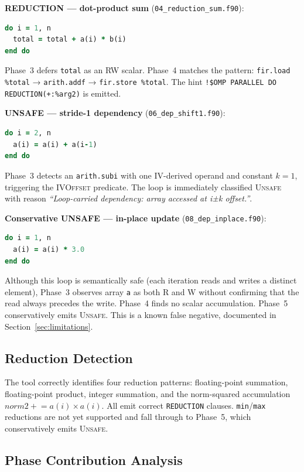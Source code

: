 \documentclass[conference]{IEEEtran}
\begin{document}
\textbf{REDUCTION — dot-product sum} (\texttt{04\_reduction\_sum.f90}):
\begin{lstlisting}[language=Fortran,caption={Scalar accumulation reduction.}]
do i = 1, n
  total = total + a(i) * b(i)
end do
\end{lstlisting}
Phase~3 defers \texttt{total} as an RW scalar.  Phase~4 matches the
pattern: \texttt{fir.load \%total} → \texttt{arith.addf} →
\texttt{fir.store \%total}.  The hint
\texttt{!\$OMP PARALLEL DO REDUCTION(+:\%arg2)} is emitted.

\textbf{UNSAFE — stride-1 dependency} (\texttt{06\_dep\_shift1.f90}):
\begin{lstlisting}[language=Fortran,caption={Loop-carried dependency.}]
do i = 2, n
  a(i) = a(i) + a(i-1)
end do
\end{lstlisting}
Phase~3 detects an \texttt{arith.subi} with one IV-derived operand
and constant $k = 1$, triggering the \textsc{IVOffset} predicate.
The loop is immediately classified \textsc{Unsafe} with reason
\emph{``Loop-carried dependency: array accessed at i±k offset.''}.

\textbf{Conservative UNSAFE — in-place update} (\texttt{08\_dep\_inplace.f90}):
\begin{lstlisting}[language=Fortran,caption={In-place update (conservatively UNSAFE).}]
do i = 1, n
  a(i) = a(i) * 3.0
end do
\end{lstlisting}
Although this loop is semantically safe (each iteration reads and
writes a distinct element), Phase~3 observes array \texttt{a} as both
\textsc{R} and \textsc{W} without confirming that the read always
precedes the write.  Phase~4 finds no scalar accumulation.  Phase~5
conservatively emits \textsc{Unsafe}.  This is a known false negative,
documented in Section~\ref{sec:limitations}.

\subsection{Reduction Detection}

The tool correctly identifies four reduction patterns: floating-point
summation, floating-point product, integer summation, and the
norm-squared accumulation $\textit{norm2} \mathrel{+}=
a(i) \times a(i)$.  All emit correct \texttt{REDUCTION} clauses.
\texttt{min}/\texttt{max} reductions are not yet supported and fall
through to Phase~5, which conservatively emits \textsc{Unsafe}.

\subsection{Phase Contribution Analysis}
\end{document}
